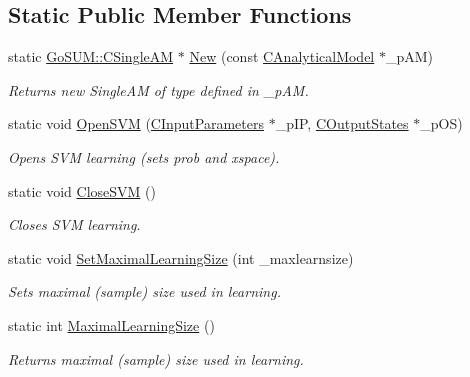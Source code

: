 \subsection*{Static Public Member Functions}
\begin{DoxyCompactItemize}
\item 
static \hyperlink{class_go_s_u_m_1_1_c_single_a_m}{Go\-S\-U\-M\-::\-C\-Single\-A\-M} $\ast$ \hyperlink{class_go_s_u_m_1_1_c_single_a_m_a41a4282c86821ec89b1213e0c6f13b13}{New} (const \hyperlink{class_go_s_u_m_1_1_c_analytical_model}{C\-Analytical\-Model} $\ast$\-\_\-p\-A\-M)
\begin{DoxyCompactList}\small\item\em Returns new Single\-A\-M of type defined in \-\_\-p\-A\-M. \end{DoxyCompactList}\item 
static void \hyperlink{class_go_s_u_m_1_1_c_single_a_m_aa7d0ce37e8f5e41a4879a234c6c2f91a}{Open\-S\-V\-M} (\hyperlink{class_go_s_u_m_1_1_c_input_parameters}{C\-Input\-Parameters} $\ast$\-\_\-p\-I\-P, \hyperlink{class_go_s_u_m_1_1_c_output_states}{C\-Output\-States} $\ast$\-\_\-p\-O\-S)
\begin{DoxyCompactList}\small\item\em Opens S\-V\-M learning (sets prob and xspace). \end{DoxyCompactList}\item 
static void \hyperlink{class_go_s_u_m_1_1_c_single_a_m_a67f8dbc5d1f4a6ad214a9a0e639c0158}{Close\-S\-V\-M} ()
\begin{DoxyCompactList}\small\item\em Closes S\-V\-M learning. \end{DoxyCompactList}\item 
static void \hyperlink{class_go_s_u_m_1_1_c_single_a_m_aaf59d09d77621bbdba02ca88400adcd5}{Set\-Maximal\-Learning\-Size} (int \-\_\-maxlearnsize)
\begin{DoxyCompactList}\small\item\em Sets maximal (sample) size used in learning. \end{DoxyCompactList}\item 
static int \hyperlink{class_go_s_u_m_1_1_c_single_a_m_acd3ea9f80324d9580f750cbc8f3d9338}{Maximal\-Learning\-Size} ()
\begin{DoxyCompactList}\small\item\em Returns maximal (sample) size used in learning. \end{DoxyCompactList}\item 

\end{DoxyCompactItemize}
